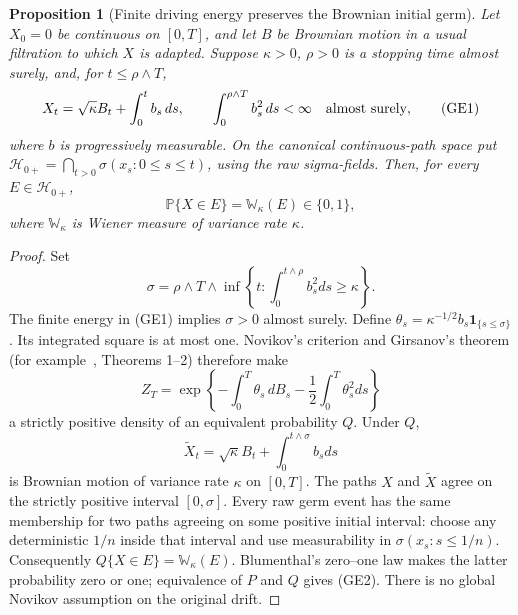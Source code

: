 \documentclass[11pt]{article}
\newtheorem{proposition}[theorem]{Proposition}
\theoremstyle{definition}\newtheorem{definition}[theorem]{Definition}
\theoremstyle{remark}\newtheorem{remark}[theorem]{Remark}
\begin{document}
\begin{proposition}[Finite driving energy preserves the Brownian initial germ]
\label{prop:finite-energy-germ}
Let $X_0=0$ be continuous on $[0,T]$, and let $B$ be Brownian motion
in a usual filtration to which $X$ is adapted. Suppose $\kappa>0$, $\rho>0$
is a stopping time almost surely, and, for $t\le\rho\wedge T$,
\[
 X_t=\sqrt\kappa B_t+\int_0^t b_s\,ds,\qquad
 \int_0^{\rho\wedge T}b_s^2\,ds<\infty\quad\hbox{almost surely},
 \tag{GE1}
\]
where $b$ is progressively measurable. On the canonical continuous-path
space put $\mathcal H_{0+}=\bigcap_{t>0}\sigma(x_s:0\le s\le t)$,
using the raw sigma-fields. Then, for every $E\in\mathcal H_{0+}$,
\[
 \mathbb P\{X\in E\}=\mathbb W_\kappa(E)\in\{0,1\},
 \tag{GE2}
\]
where $\mathbb W_\kappa$ is Wiener measure of variance rate $\kappa$.
\end{proposition}
\begin{proof}
Set
\[
 \sigma=\rho\wedge T\wedge
       \inf\left\{t:\int_0^{t\wedge\rho}b_s^2ds\ge\kappa\right\}.
\]
The finite energy in (GE1) implies $\sigma>0$ almost surely. Define
$\theta_s=\kappa^{-1/2}b_s\mathbf1_{\{s\le\sigma\}}$. Its integrated
square is at most one. Novikov's criterion and Girsanov's theorem
(for example~\cite{lalley-girsanov}, Theorems 1--2) therefore make
\[
 Z_T=\exp\left\{-\int_0^T\theta_s\,dB_s
                         -\frac12\int_0^T\theta_s^2ds\right\}
\]
a strictly positive density of an equivalent probability $Q$. Under $Q$,
\[
 \widetilde X_t=\sqrt\kappa B_t+\int_0^{t\wedge\sigma}b_sds
\]
is Brownian motion of variance rate $\kappa$ on $[0,T]$. The paths
$X$ and $\widetilde X$ agree on the strictly positive interval
$[0,\sigma]$. Every raw germ event has the same membership for two
paths agreeing on some positive initial interval: choose any deterministic
$1/n$ inside that interval and use measurability in
$\sigma(x_s:s\le1/n)$. Consequently
$Q\{X\in E\}=\mathbb W_\kappa(E)$. Blumenthal's zero--one law makes
the latter probability zero or one; equivalence of $P$ and $Q$ gives
(GE2). There is no global Novikov assumption on the original drift.
\end{proof}
\end{document}
